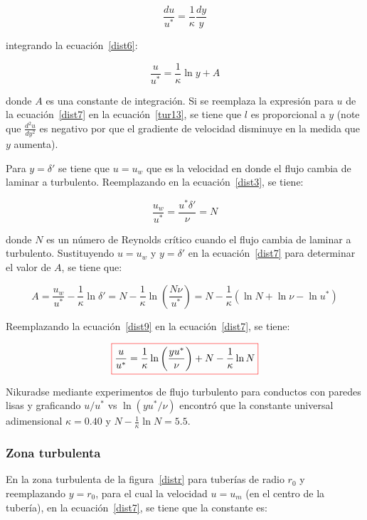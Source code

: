 \documentclass[11pt, oneside]{article}
\begin{document}
\begin{equation}
\frac{du}{u^*} = \frac{1}{\kappa} \frac{dy}{y}
\label{dist6}
\end{equation}

integrando la ecuaci\'on~\ref{dist6}:

\begin{equation}
\frac{u}{u^*} = \frac{1}{\kappa} \ln y + A
\label{dist7}
\end{equation}

donde $A$ es una constante de integraci\'on. Si se reemplaza la expresi\'on para $u$ de la ecuaci\'on~\ref{dist7} en la ecuaci\'on~\ref{tur13}, se tiene que $l$ es proporcional a $y$ (note que $\frac{d^2 u}{dy^2}$ es negativo por que el gradiente de velocidad disminuye en la medida que $y$ aumenta). 

Para $y = \delta '$ se tiene que $u= u_w$ que es la velocidad en donde el flujo cambia de laminar a turbulento. Reemplazando en la ecuaci\'on~\ref{dist3}, se tiene:

\begin{equation}
\frac{u_w}{u^*} = \frac{u^* \delta '}{\nu} = N
\label{dist8}
\end{equation}

donde $N$ es un n\'umero de Reynolds cr\'itico cuando el flujo cambia de laminar a turbulento. Sustituyendo $u= u_w $ y $y = \delta '$ en la ecuaci\'on~\ref{dist7} para determinar el valor de $A$, se tiene que:

\begin{equation}
A = \frac{u_w }{u^* } - \frac{1}{\kappa} \ln \delta ' = N - \frac{1}{\kappa} \ln \left( \frac{N \nu}{u^*} \right) =N - \frac{1}{\kappa}  ( \ln N + \ln \nu  - \ln u^* )  
\label{dist9}
\end{equation}

Reemplazando la ecuaci\'on~\ref{dist9} en la ecuaci\'on~\ref{dist7}, se tiene:

\begin{equation}
\color{red}\boxed{\color{black} \frac{u}{u^*} = \frac{1}{\kappa} \ln \left(\frac{y u^*}{\nu}\right) + N - \frac{1}{\kappa} \ln N }
\label{dist10}
\end{equation}

Nikuradse mediante experimentos de flujo turbulento para conductos con paredes lisas y graficando $u/u^*$ vs $\ln(y u^*/ \nu )$ encontr\'o que la constante universal adimensional $\kappa = 0.40$ y  $N - \frac{1}{\kappa} \ln N  = 5.5$.

\subsubsection*{Zona turbulenta}
En la zona turbulenta de la figura~\ref{distr} para tuber\'ias de radio $r_0$ y reemplazando $y=r_0$, para el cual la velocidad $u=u_m $ (en el centro de la tuber\'ia), en la ecuaci\'on~\ref{dist7}, se tiene que la constante es:
\end{document}
